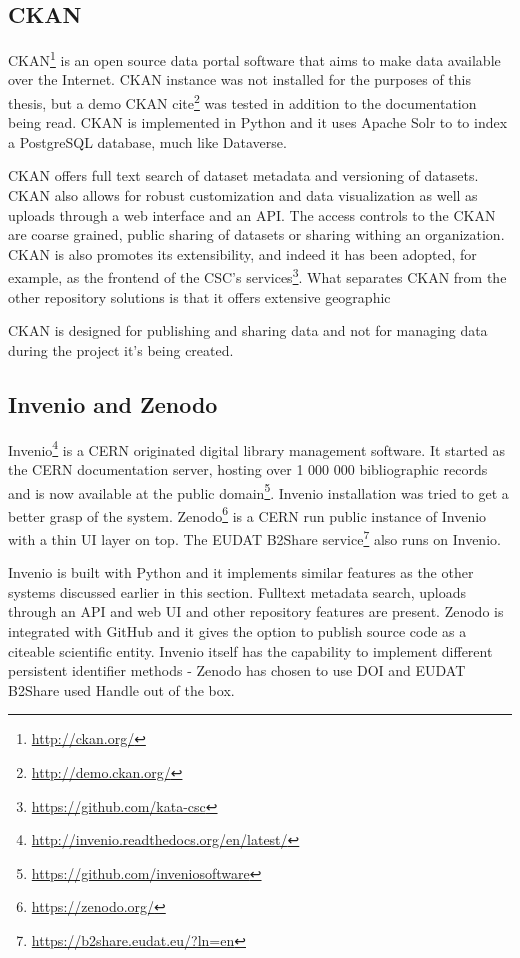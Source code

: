 \subsection{CKAN}

CKAN\footnote{\url{http://ckan.org/}} is an open source data portal software that aims to make data available
over the Internet. CKAN instance was not installed for the purposes of this
thesis, but a demo CKAN cite\footnote{\url{http://demo.ckan.org/}} was tested
in addition to the documentation being read. CKAN is implemented in Python and
it uses Apache Solr to to index a PostgreSQL database, much like Dataverse.

CKAN offers full text search of dataset metadata and versioning of datasets.
CKAN also allows for robust customization and data visualization as well as
uploads through a web interface and an API. The access controls to the CKAN
are coarse grained, public sharing of datasets or sharing withing an
organization. CKAN is also promotes its extensibility, and indeed it has been
adopted, for example, as the frontend of the CSC's
services\footnote{\url{https://github.com/kata-csc}}. What separates CKAN from
the other repository solutions is that it offers extensive geographic

CKAN is designed for publishing and sharing data and not for managing data
during the project it's being created.

\subsection{Invenio and Zenodo}

Invenio\footnote{\url{http://invenio.readthedocs.org/en/latest/}} is a CERN
originated digital library management software. It started as the CERN
documentation server, hosting over 1 000 000 bibliographic records and is now
available at the public domain\footnote{\url{https://github.com/inveniosoftware}}.
Invenio installation was tried to get a better grasp of the system. Zenodo\footnote{\url{https://zenodo.org/}}
is a CERN run public instance of Invenio with a thin UI layer on top. The EUDAT
B2Share service\footnote{\url{https://b2share.eudat.eu/?ln=en}} also runs on
Invenio.

Invenio is built with Python and it implements similar features as the other
systems discussed earlier in this section. Fulltext metadata search, uploads
through an API and web UI and other repository features are present. Zenodo is
integrated with GitHub and it gives the option to publish source code as a
citeable scientific entity. Invenio itself has the capability to implement
different persistent identifier methods - Zenodo has chosen to use DOI and
EUDAT B2Share used Handle out of the box.

